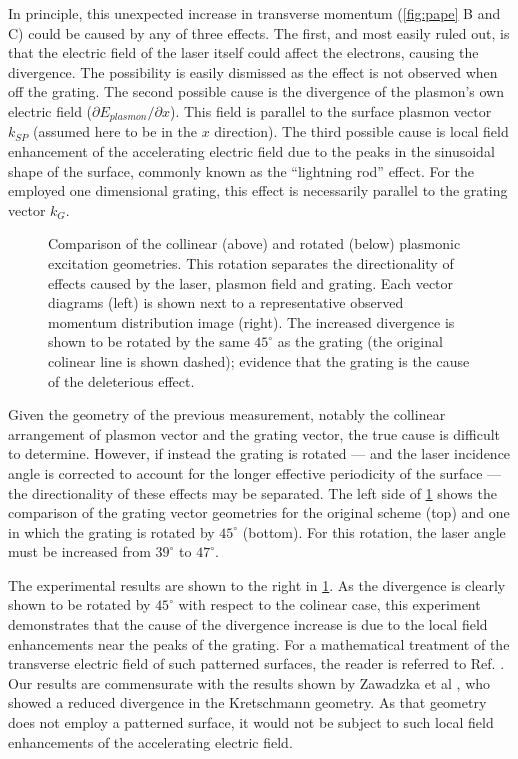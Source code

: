In principle, this unexpected increase in transverse momentum (\ref{fig:pape} B and C) could be caused by any of three effects.
The first, and most easily ruled out, is that the electric field of the laser itself could affect the electrons, causing the divergence.
The possibility is easily dismissed as the effect is not observed when off the grating.
The second possible cause is the divergence of the plasmon's own electric field ($\partial E_{plasmon} / \partial x$).
This field is parallel to the surface plasmon vector $k_{SP}$ (assumed here to be in the $x$ direction).
The third possible cause is local field enhancement of the accelerating electric field due to the peaks in the sinusoidal shape of the surface, commonly known as the ``lightning rod'' effect.
For the employed one dimensional grating, this effect is necessarily parallel to the grating vector $k_G$.

\begin{figure}
  \centering
  
  \caption[Comparison of the colinear and rotated plasmonic excitation geometries]{
    Comparison of the collinear (above) and rotated (below) plasmonic excitation geometries.
    This rotation separates the directionality of effects caused by the laser, plasmon field and grating.
    Each vector diagrams (left) is shown next to a representative observed momentum distribution image (right).
    The increased divergence is shown to be rotated by the same $45^{\circ}$ as the grating (the original colinear line is shown dashed); evidence that the grating is the cause of the deleterious effect.
  }
  \label{fig:rotated}
\end{figure}

Given the geometry of the previous measurement, notably the collinear arrangement of plasmon vector and the grating vector, the true cause is difficult to determine.
However, if instead the grating is rotated --- and the laser incidence angle is corrected to account for the longer effective periodicity of the surface --- the directionality of these effects may be separated.
The left side of \ref{fig:rotated} shows the comparison of the grating vector geometries for the original scheme (top) and one in which the grating is rotated by $45^{\circ}$ (bottom).
For this rotation, the laser angle must be increased from $39^{\circ}$ to $47^{\circ}$.

The experimental results are shown to the right in \ref{fig:rotated}.
As the divergence is clearly shown to be rotated by $45^{\circ}$ with respect to the colinear case, this experiment demonstrates that the cause of the divergence increase is due to the local field enhancements near the peaks of the grating.
For a mathematical treatment of the transverse electric field of such patterned surfaces, the reader is referred to Ref. \cite{watts_sharp_1997}. 
Our results are commensurate with the results shown by Zawadzka et al \cite{zawadzka_evanescent_2001}, who showed a reduced divergence in the Kretschmann geometry.
As that geometry does not employ a patterned surface, it would not be subject to such local field enhancements of the accelerating electric field.


